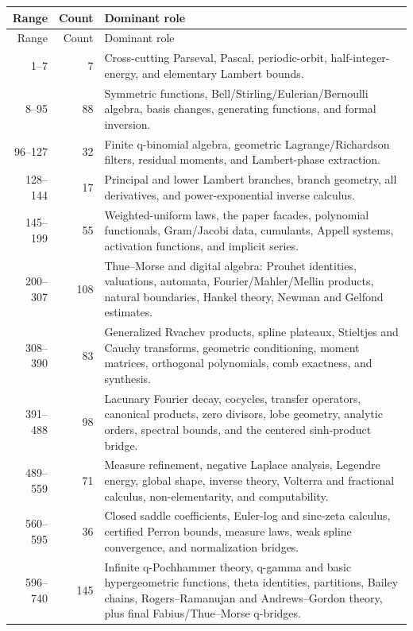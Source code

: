 \documentclass[11pt,oneside]{report}
\theoremstyle{definition}
\theoremstyle{remark}
\begin{document}
\begin{longtable}{@{}r r >{\raggedright\arraybackslash}p{}@{}}
\toprule
Range & Count & Dominant role \\
\midrule
\endfirsthead
\toprule
Range & Count & Dominant role \\
\midrule
\endhead
1--7 & 7 & Cross-cutting Parseval, Pascal, periodic-orbit, half-integer-energy, and elementary Lambert bounds. \\
8--95 & 88 & Symmetric functions, Bell/Stirling/Eulerian/Bernoulli algebra, basis changes, generating functions, and formal inversion. \\
96--127 & 32 & Finite q-binomial algebra, geometric Lagrange/Richardson filters, residual moments, and Lambert-phase extraction. \\
128--144 & 17 & Principal and lower Lambert branches, branch geometry, all derivatives, and power-exponential inverse calculus. \\
145--199 & 55 & Weighted-uniform laws, the paper facades, polynomial functionals, Gram/Jacobi data, cumulants, Appell systems, activation functions, and implicit series. \\
200--307 & 108 & Thue--Morse and digital algebra: Prouhet identities, valuations, automata, Fourier/Mahler/Mellin products, natural boundaries, Hankel theory, Newman and Gelfond estimates. \\
308--390 & 83 & Generalized Rvachev products, spline plateaux, Stieltjes and Cauchy transforms, geometric conditioning, moment matrices, orthogonal polynomials, comb exactness, and synthesis. \\
391--488 & 98 & Lacunary Fourier decay, cocycles, transfer operators, canonical products, zero divisors, lobe geometry, analytic orders, spectral bounds, and the centered sinh-product bridge. \\
489--559 & 71 & Measure refinement, negative Laplace analysis, Legendre energy, global shape, inverse theory, Volterra and fractional calculus, non-elementarity, and computability. \\
560--595 & 36 & Closed saddle coefficients, Euler-log and sinc-zeta calculus, certified Perron bounds, measure laws, weak spline convergence, and normalization bridges. \\
596--740 & 145 & Infinite q-Pochhammer theory, q-gamma and basic hypergeometric functions, theta identities, partitions, Bailey chains, Rogers--Ramanujan and Andrews--Gordon theory, plus final Fabius/Thue--Morse q-bridges. \\
\bottomrule
\end{longtable}
\end{document}
